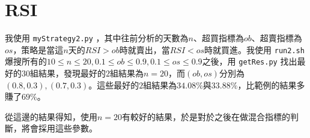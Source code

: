 \section{RSI}

我使用 \texttt{myStrategy2.py} ，其中往前分析的天數為$n$、超買指標為$ob$、超賣指標為$os$，策略是當這$n$天的$RSI>ob$時就賣出，當$RSI<os$時就買進。我使用 \texttt{run2.sh} 爆搜所有的$10\leq n\leq20, 0.1\leq ob\leq0.9, 0.1\leq os\leq0.9$之後，用 \texttt{getRes.py} 找出最好的$30$組結果，發現最好的$2$組結果為$n=20$，而$(ob, os)$分別為$(0.8, 0.3), (0.7, 0.3)$。這些最好的$2$組結果為$34.08\%$與$33.88\%$，比範例的結果多賺了$69\%$。

從這邊的結果得知，使用$n=20$有較好的結果，於是對於之後在做混合指標的判斷，將會採用這些參數。
